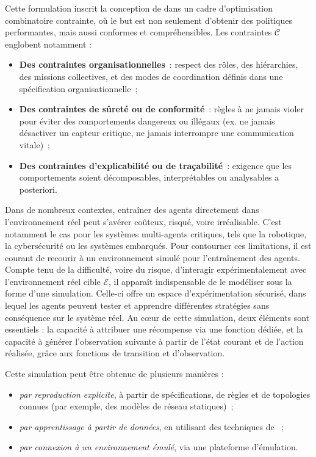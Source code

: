 \noindent
Cette formulation inscrit la conception de  dans un cadre d'optimisation combinatoire contrainte, où le but est non seulement d'obtenir des politiques performantes, mais aussi conformes et compréhensibles.
%
Les contraintes $\mathcal{C}$ englobent notamment :
\begin{itemize}
  \item \textbf{Des contraintes organisationnelles}~: respect des rôles, des hiérarchies, des missions collectives, et des modes de coordination définis dans une spécification organisationnelle~;
  \item \textbf{Des contraintes de sûreté ou de conformité}~: règles à ne jamais violer pour éviter des comportements dangereux ou illégaux (ex. ne jamais désactiver un capteur critique, ne jamais interrompre une communication vitale)~;
  \item \textbf{Des contraintes d'explicabilité ou de traçabilité}~: exigence que les comportements soient décomposables, interprétables ou analysables a posteriori.
\end{itemize}

Dans de nombreux contextes, entraîner des agents directement dans l’environnement réel peut s’avérer coûteux, risqué, voire irréalisable. C’est notamment le cas pour les systèmes multi-agents critiques, tels que la robotique, la cybersécurité ou les systèmes embarqués. Pour contourner ces limitations, il est courant de recourir à un environnement simulé pour l’entraînement des agents. Compte tenu de la difficulté, voire du risque, d'interagir expérimentalement avec l'environnement réel cible $\mathcal{E}$, il apparaît indispensable de le modéliser sous la forme d'une simulation. Celle-ci offre un espace d'expérimentation sécurisé, dans lequel les agents peuvent tester et apprendre différentes stratégies sans conséquence sur le système réel. Au cœur de cette simulation, deux éléments sont essentiels : la capacité à attribuer une récompense via une fonction dédiée, et la capacité à générer l’observation suivante à partir de l’état courant et de l’action réalisée, grâce aux fonctions de transition et d’observation.


Cette simulation peut être obtenue de plusieurs manières :
\begin{itemize}
  \item \emph{par reproduction explicite}, à partir de spécifications, de règles et de topologies connues (par exemple, des modèles de réseau statiques)~;
  \item \emph{par apprentissage à partir de données}, en utilisant des techniques de ~;
  \item \emph{par connexion à un environnement émulé}, via une plateforme d'émulation.
\end{itemize}

